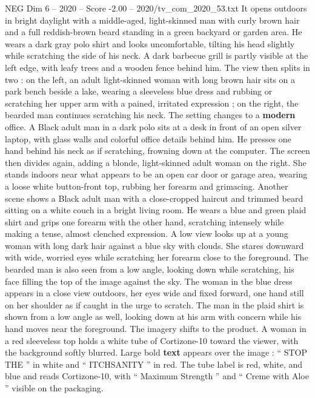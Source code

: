 \begin{textsample}{NEG Dim 6 – 2020 – Score -2.00 – 2020/tv\_com\_2020\_53.txt}  \label{ex:f6_neg_039}
It opens outdoors in bright daylight with a middle-aged, light-skinned man with curly brown hair and a full reddish-brown beard standing in a green backyard or garden area.
He wears a dark gray polo shirt and looks uncomfortable, tilting his head slightly while scratching the side of his neck.
A dark barbecue grill is partly visible at the left edge, with leafy trees and a wooden fence behind him.
The view then splits in two : on the left, an adult light-skinned woman with long brown hair sits on a park bench beside a lake, wearing a sleeveless blue dress and rubbing or scratching her upper arm with a pained, irritated expression ; on the right, the bearded man continues scratching his neck.
The setting changes to a \textbf{modern} office.
A Black adult man in a dark polo sits at a desk in front of an open silver laptop, with glass walls and colorful office details behind him.
He presses one hand behind his neck as if scratching, frowning down at the computer.
The screen then divides again, adding a blonde, light-skinned adult woman on the right.
She stands indoors near what appears to be an open car door or garage area, wearing a loose white button-front top, rubbing her forearm and grimacing.
Another scene shows a Black adult man with a close-cropped haircut and trimmed beard sitting on a white couch in a bright living room.
He wears a blue and green plaid shirt and grips one forearm with the other hand, scratching intensely while making a tense, almost clenched expression.
A low view looks up at a young woman with long dark hair against a blue sky with clouds.
She stares downward with wide, worried eyes while scratching her forearm close to the foreground.
The bearded man is also seen from a low angle, looking down while scratching, his face filling the top of the image against the sky.
The woman in the blue dress appears in a close view outdoors, her eyes wide and fixed forward, one hand still on her shoulder as if caught in the urge to scratch.
The man in the plaid shirt is shown from a low angle as well, looking down at his arm with concern while his hand moves near the foreground.
The imagery shifts to the product.
A woman in a red sleeveless top holds a white tube of Cortizone-10 toward the viewer, with the background softly blurred.
Large bold \textbf{text} appears over the image : “ STOP THE ” in white and “ ITCHSANITY ” in red.
The tube label is red, white, and blue and reads Cortizone-10, with “ Maximum Strength ” and “ Creme with Aloe ” visible on the packaging.

\end{textsample}
